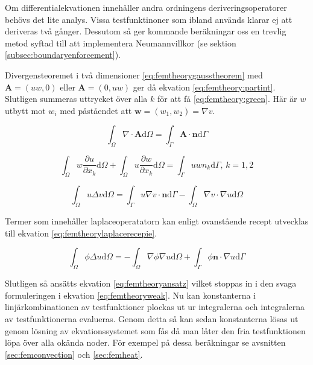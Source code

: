 \noindent
Om differentialekvationen innehåller andra ordningens deriveringsoperatorer behövs
det lite analys. Vissa testfunktinoner som ibland används klarar ej att deriveras
två gånger. Dessutom så ger kommande beräkningar oss en trevlig metod syftad
till att implementera Neumannvillkor (se sektion \ref{subsec:boundaryenforcement}).

Divergensteoremet i två dimensioner \eqref{eq:femtheorygausstheorem}
med $\mathbf{A} = (uw, 0)$ eller $\mathbf{A} = (0, uw)$ ger då ekvation
\eqref{eq:femtheory:partint}. Slutligen summeras uttrycket över alla
$k$ för att få \eqref{eq:femtheory:green}. Här är $w$ utbytt mot $w_i$ med
påståendet att $\mathbf{w} = (w_1, w_2) = \nabla v$. \cite{johnson2009}

\begin{equation}
\label{eq:femtheorygausstheorem}
\int_\Omega \nabla\cdot \mathbf{A} \mathrm{d}\Omega = \int_\Gamma \mathbf{A}\cdot\mathbf{n}
\mathrm{d}\Gamma
\end{equation}

\begin{equation}
\label{eq:femtheory:partint}
\int_\Omega w\frac{\partial u}{\partial x_k} \mathrm{d}\Omega +
\int_\Omega u\frac{\partial w}{\partial x_k} \mathrm{d}\Omega =
\int_\Gamma uwn_k \mathrm{d}\Gamma\mbox{,   }k=1,2
\end{equation}

\begin{equation}
\label{eq:femtheory:green}
\int_\Omega u\Delta v \mathrm{d}\Omega =
\int_\Gamma u\nabla v\cdot\mathbf{n}\mathrm{d}\Gamma-\int_\Omega \nabla v\cdot\nabla u \mathrm{d}\Omega
\end{equation}

\noindent
Termer som innehåller laplaceoperatatorn kan enligt ovanstående recept utvecklas
till ekvation \eqref{eq:femtheorylaplacerecepie}.

\begin{equation}
\label{eq:femtheorylaplacerecepie}
\int_\Omega \phi\Delta u \mathrm{d}\Omega = -\int_\Omega \nabla\phi\nabla u \mathrm{d}\Omega +
\int_\Gamma \phi \mathbf{n}\cdot\nabla u \mathrm{d}\Gamma
\end{equation} 

\noindent
Slutligen så ansätts ekvation \eqref{eq:femtheoryansatz} vilket stoppas
in i den svaga formuleringen i ekvation \eqref{eq:femtheoryweak}. Nu kan
konstanterna i linjärkombinationen av testfunktioner plockas ut ur integralerna
och integralerna av testfunktionerna evalueras. Genom detta så kan
sedan konstanterna lösas ut genom lösning av ekvationssystemet som
fås då man låter den fria testfunktionen löpa över alla okända noder.
För exempel på dessa beräkningar se avsnitten \ref{sec:femconvection} och
\ref{sec:femheat}.

